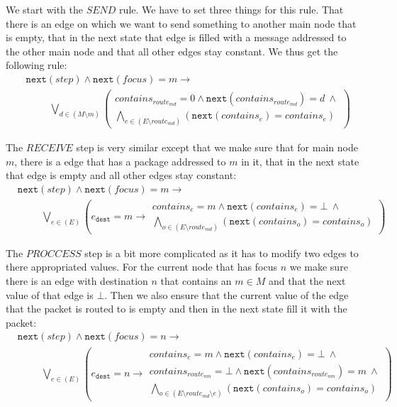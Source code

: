 \documentclass[12pt]{scrartcl}
\newcommand{\mtt}[1]{\ensuremath{\mathtt{#1}}}
\newcommand{\nt}[1]{\ensuremath{\mtt{next}(#1)}}
\begin{document}
We start with the $SEND$ rule. We have to set three things for this rule. That there is an edge on which we want to send something to another main node that is empty, that in the next state that edge is filled with a message addressed to the other main node and that all other edges stay constant. We thus get the following rule:
\begin{align*}
    &\nt{step} \wedge \nt{focus} = m \rightarrow \\
    &\hspace{1cm}\bigvee_{d\in (M\setminus m)}\left(
        \begin{array}{l}
            contains_{route_{md}} = 0 \wedge \nt{contains_{route_{md}}} = d\ \wedge \\
            \bigwedge_{e\in (E\setminus route_{md})}\left( \nt{contains_e} = contains_e\right)
        \end{array}
    \right)
\end{align*}

The $RECEIVE$ step is very similar except that we make sure that for main node $m$, there is a edge that has a package addressed to $m$ in it, that in the next state that edge is empty and all other edges stay constant:
\begin{align*}
    &\nt{step} \wedge \nt{focus} = m \rightarrow \\
    &\hspace{1cm}\bigvee_{e\in (E)}\left( e_{\mtt{dest}} = m \rightarrow
        \begin{array}{l}
            contains_{e} = m \wedge \nt{contains_{e}} = \bot\ \wedge \\
            \bigwedge_{o\in (E\setminus route_{md})}\left( \nt{contains_o} = contains_o\right)
        \end{array}
    \right)
\end{align*}

The $PROCCESS$ step is a bit more complicated as it has to modify two edges to there appropriated values. For the current node that has focus $n$ we make sure there is an edge with destination $n$ that contains an $m\in M$ and that the next value of that edge is $\bot$. Then we also ensure that the current value of the edge that the packet is routed to is empty and then in the next state fill it with the packet:
\begin{align*}
    &\nt{step} \wedge \nt{focus} = n \rightarrow \\
    &\hspace{1cm}\bigvee_{e\in (E)}\left( e_{\mtt{dest}} = n \rightarrow
        \begin{array}{l}
            contains_{e} = m \wedge \nt{contains_{e}} = \bot\ \wedge \\
            contains_{route_{nm}} = \bot \wedge \nt{contains_{route_{nm}}} = m\ \wedge \\
            \bigwedge_{o\in (E\setminus route_{md} \setminus e)}\left( \nt{contains_o} = contains_o\right)
        \end{array}
    \right)
\end{align*}
\end{document}
